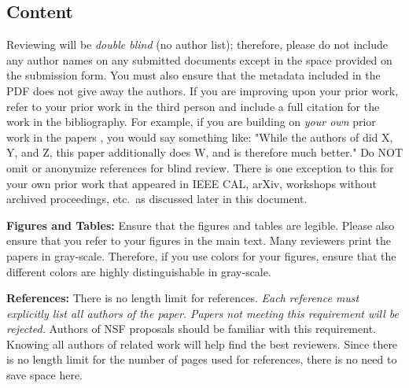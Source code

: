 \documentclass{sig-alternate}
\begin{document}
\subsection{Content}

Reviewing will be {\em double blind} (no author list); therefore, please do not include any author names on any submitted documents except in the space provided on the submission form.  You must also ensure that the metadata included in the PDF does not give away the authors. If you are improving upon your prior work, refer to your prior work in the third person and include a full citation for the work in the bibliography.  For example, if you are building on {\em your own} prior work in the papers \cite{nicepaper1,nicepaper2,nicepaper3}, you would say something like: "While the authors of \cite{nicepaper1,nicepaper2,nicepaper3} did X, Y, and Z, this paper additionally does W, and is therefore much better."  Do NOT omit or anonymize references for blind review.  There is one exception to this for your own prior work that appeared in IEEE CAL, arXiv, workshops without archived proceedings, etc.\, as discussed later in this document.

\noindent\textbf{Figures and Tables:} Ensure that the figures and tables are legible.  Please also ensure that you refer to your figures in the main text.  Many reviewers print the papers in gray-scale. Therefore, if you use colors for your figures, ensure that the different colors are highly distinguishable in gray-scale.

\noindent\textbf{References:}  There is no length limit for references. {\em Each reference must explicitly list all authors of the paper.  Papers not meeting this requirement will be rejected.} Authors of NSF proposals should be familiar with this requirement. Knowing all authors of related work will help find the best reviewers. Since there is no length limit for the number of pages used for references, there is no need to save space here.
\end{document}
